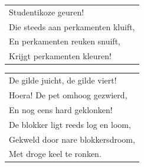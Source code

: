 \documentclass[a4paper, 14pt]{extarticle}
\begin{document}
\begin{flushleft}
\begin{tabularx}{0.8\textwidth} {
   >{\raggedright\arraybackslash}X}
Studentikoze geuren!\\
Die steeds aan perkamenten kluift,\\
En perkamenten reuken snuift,\\
Krijgt perkamenten kleuren!\\
\end{tabularx}
\end{flushleft}\begin{flushleft}
\begin{tabularx}{0.8\textwidth} {
   >{\raggedright\arraybackslash}X}
De gilde juicht, de gilde viert!\\
Hoera! De pet omhoog gezwierd,\\
En nog eens hard geklonken!\\
De blokker ligt reeds log en loom,\\
Gekweld door nare blokkersdroom,\\
Met droge keel te ronken.\\
\end{tabularx}
\end{flushleft}
\end{document}
